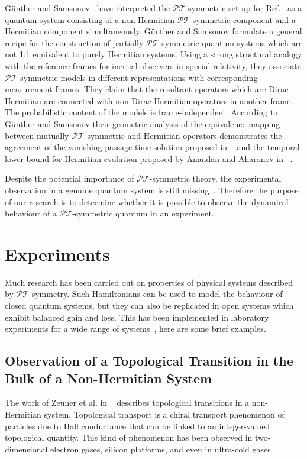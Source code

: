 \documentclass[12pt, a4paper]{report}
\newcommand\PT{\(\mathcal{PT}\)}
\begin{document}
G\"{u}nther and Samsonov~\cite{Gunther_2008} have interpreted the \PT-symmetric set-up for Ref.~\cite{Bender_2007} as a quantum system consisting of a non-Hermitian \PT-symmetric component and a Hermitian component simultaneously. G\"{u}nther and Samsonov formulate a general recipe for the construction of partially \PT-symmetric quantum
systems which are not 1:1 equivalent to purely Hermitian systems. Using a strong structural analogy with the
reference frames for inertial observers in special relativity, they associate \PT-symmetric models in different
representations with corresponding measurement frames. They claim that the resultant operators which are Dirac Hermitian
are connected with non-Dirac-Hermitian operators in another frame. The probabilistic content of the models
is frame-independent. According to G\"{u}nther and Samsonov their geometric analysis of the equivalence mapping between mutually \PT-symmetric and Hermitian operators demonstrates the agreement of the vanishing passage-time solution proposed in ~\cite{Bender_2007} and the temporal lower bound for Hermitian evolution proposed by Anandan and Aharonov in ~\cite{AnandanAharonov}. 

Despite the potential importance of \PT-symmetric theory, the experimental observation in a genuine quantum system is still missing~\cite{Cartarius}. Therefore the purpose of our research is to determine whether it is possible to observe the dynamical behaviour of a \PT-symmetric quantum in an experiment. 

\chapter{Experiments}\label{Experiments}
Much research has been carried out on properties of physical systems described by \PT-symmetry. Such Hamiltonians can be used to model the behaviour of closed quantum systems, but they can also be replicated in open systems which exhibit balanced gain and loss. This has been implemented in laboratory experiments for a wide range of systems~\cite{geometric_aspects}, here are some brief examples.

\section{Observation of a Topological Transition in the Bulk of a Non-Hermitian System}\label{TopologicalTrans}
The work of Zeuner et al. in ~\cite{TopoTrans} describes topological transitions in a non-Hermitian system. 
Topological transport is a chiral transport phenomenon of particles due to Hall conductance that can be linked to an integer-valued topological quantity. This kind of phenomenon has been observed in two-dimensional electron gases, silicon platforms, and even in ultra-cold gases~\cite{TopoTrans}. 
\end{document}
